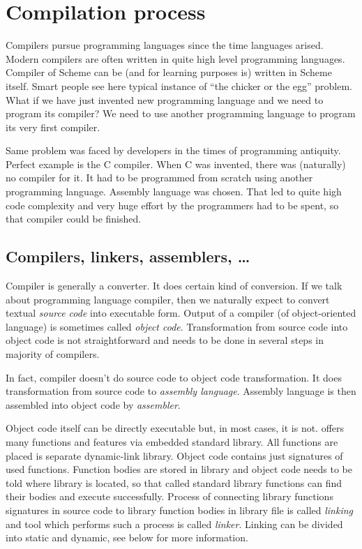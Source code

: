 \chapter{Compilation process}\label{section:compilation}
Compilers pursue programming languages since the time languages arised. Modern compilers are often written in quite high level programming languages. Compiler of Scheme can be (and for learning purposes is) written in Scheme itself. Smart people see here typical instance of \enquote{the chicker or the egg} problem. What if we have just invented new programming language and we need to program its compiler? We need to use another programming language to program its very first compiler.

Same problem was faced by developers in the times of programming antiquity. Perfect example is the C compiler. When C was invented, there was (naturally) no compiler for it. It had to be programmed from scratch using another programming language. Assembly language was chosen. That led to quite high code complexity and very huge effort by the programmers had to be spent, so that compiler could be finished.

\section{Compilers, linkers, assemblers, \ldots}
Compiler is generally a converter. It does certain kind of conversion. If we talk about programming language compiler, then we naturally expect to convert textual \textit{source code} into executable form. Output of a compiler (of object-oriented language) is sometimes called \textit{object code}. Transformation from source code into object code is not straightforward and needs to be done in several steps in majority of \cpp{} compilers.

In fact, compiler doesn't do source code to object code transformation. It does transformation from source code to \textit{assembly language}. Assembly language is then assembled into object code by \textit{assembler}.

Object code itself can be directly executable but, in most cases, it is not. \cpp{} offers many functions and features via embedded standard library. All functions are placed is separate dynamic-link library. Object code contains just signatures of used functions. Function bodies are stored in library and object code needs to be told where library is located, so that called standard library functions can find their bodies and execute successfully. Process of connecting library functions signatures in source code to library function bodies in library file is called \textit{linking} and tool which performs such a process is called \textit{linker}. Linking can be divided into static and dynamic, see below for more information.

